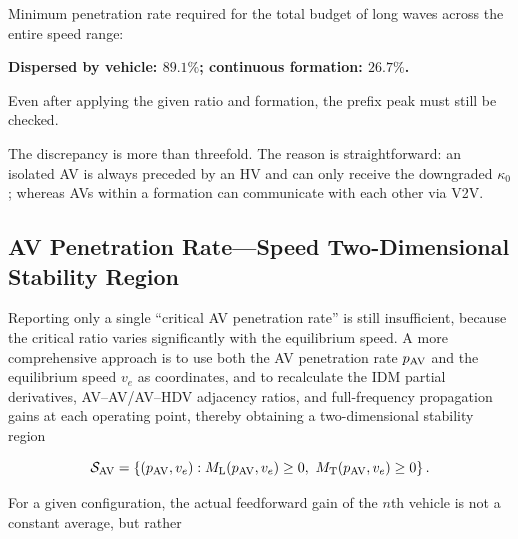 \documentclass[11pt,a4paper,openany]{book}
\numberwithin{equation}{chapter}
\numberwithin{figure}{chapter}
\numberwithin{table}{chapter}
\begin{document}
\begin{tcolorbox}[keybox,title=\textbf{Key Figures}]

Minimum penetration rate required for the total budget of long waves across the entire speed range:




\textbf{Dispersed by vehicle: $89.1\%$; continuous formation: $26.7\%$.}




 Even after applying the given ratio and formation, the prefix peak must still be checked.




The discrepancy is more than threefold. The reason is straightforward: an isolated AV is always preceded by an HV and can only receive the downgraded $\kappa_0$; whereas AVs within a formation can communicate with each other via V2V.







\end{tcolorbox}

\subsection{AV Penetration Rate—Speed Two-Dimensional Stability Region}







\label{sub:av-plane}




Reporting only a single “critical AV penetration rate” is still insufficient, because the critical ratio varies significantly with the equilibrium speed. A more comprehensive approach is to use both the AV penetration rate $p_{\rm AV}$ and the equilibrium speed $v_e$ as coordinates, and to recalculate the IDM partial derivatives, AV–AV/AV–HDV adjacency ratios, and full-frequency propagation gains at each operating point, thereby obtaining a two-dimensional stability region

\begin{equation}
\mathcal S_{\rm AV}
=\left\{(p_{\rm AV},v_e):M_{\rm L}(p_{\rm AV},v_e)\ge0,
\ M_{\rm T}(p_{\rm AV},v_e)\ge0\right\}.
\label{eq:av-stability-set}
\end{equation}




For a given configuration, the actual feedforward gain of the $n$th vehicle is not a constant average, but rather
\end{document}
